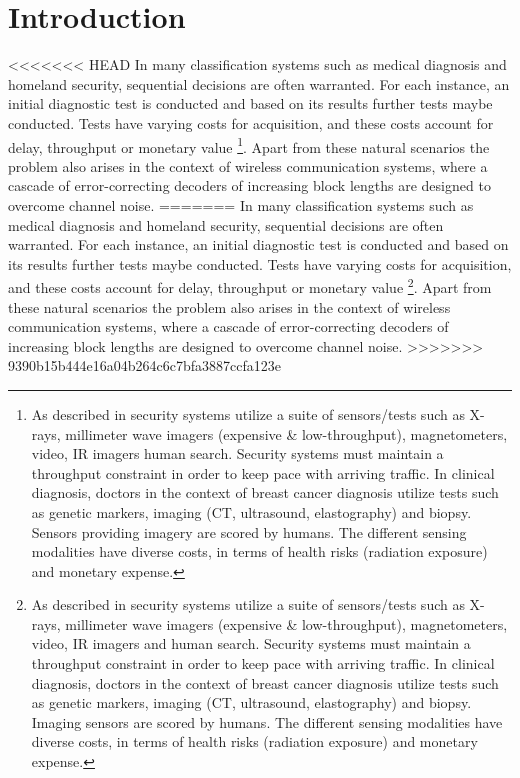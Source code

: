 \documentclass{article}
\begin{document}
\section{Introduction}
<<<<<<< HEAD
In many classification systems  such as medical diagnosis  and  homeland  security,  sequential decisions  are  often  warranted.   For each  instance,  an initial diagnostic test  is conducted and based on its results further tests maybe conducted. Tests have varying  costs for  acquisition,  and  these  costs  account  for delay,  throughput  or  monetary  value \footnote{As described in \cite{ML13_MultistageClassifier_TrapezSaligramaCastanon} security systems utilize a suite of sensors/tests such as X-rays, millimeter wave imagers (expensive \& low-throughput), magnetometers, video, IR imagers human search.  Security systems  must  maintain  a  throughput  constraint  in  order to  keep  pace  with  arriving  traffic.   In  clinical  diagnosis, doctors  in the context of breast cancer diagnosis utilize tests such as genetic markers, imaging (CT, ultrasound, elastography) and biopsy. Sensors providing imagery are scored by humans. The different sensing  modalities  have  diverse  costs,  in  terms  of  health risks (radiation exposure) and monetary expense.}. Apart from these natural scenarios the problem also arises in the context of wireless communication systems, where a cascade of error-correcting decoders of increasing block lengths are designed to overcome channel noise. 
=======
In many classification systems  such as medical diagnosis  and  homeland  security,  sequential decisions  are  often  warranted.   For each  instance,  an initial diagnostic test  is conducted and based on its results further tests maybe conducted. Tests have varying  costs for  acquisition,  and  these  costs  account  for delay,  throughput  or  monetary  value \footnote{As described in \cite{Trapeznikov} security systems utilize a suite of sensors/tests such as X-rays, millimeter wave imagers (expensive \& low-throughput), magnetometers, video, IR imagers and human search.  Security systems  must  maintain  a  throughput  constraint  in  order to  keep  pace  with  arriving  traffic.   In  clinical  diagnosis, doctors  in the context of breast cancer diagnosis utilize tests such as genetic markers, imaging (CT, ultrasound, elastography) and biopsy. Imaging sensors are scored by humans. The different sensing  modalities  have  diverse  costs,  in  terms  of  health risks (radiation exposure) and monetary expense.}. Apart from these natural scenarios the problem also arises in the context of wireless communication systems, where a cascade of error-correcting decoders of increasing block lengths are designed to overcome channel noise. 
>>>>>>> 9390b15b444e16a04b264c6c7bfa3887ccfa123e
\end{document}
